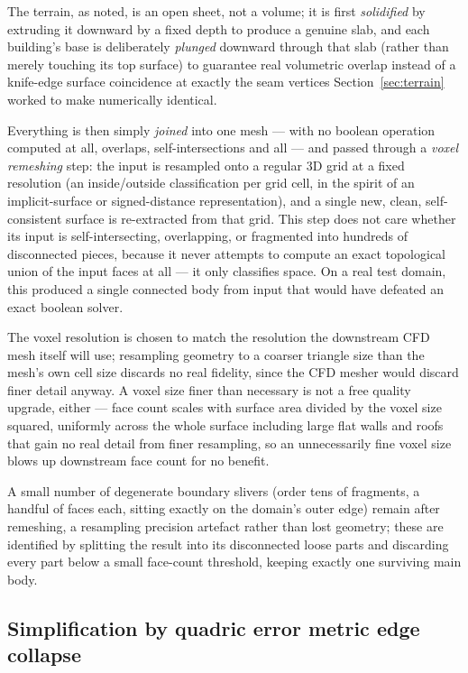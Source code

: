 \documentclass[11pt]{article}
\begin{document}
The terrain, as noted, is an open sheet, not a volume; it is first \emph{solidified} by
extruding it downward by a fixed depth to produce a genuine slab, and each building's base is
deliberately \emph{plunged} downward through that slab (rather than merely touching its top
surface) to guarantee real volumetric overlap instead of a knife-edge surface coincidence at
exactly the seam vertices Section~\ref{sec:terrain} worked to make numerically identical.

Everything is then simply \emph{joined} into one mesh --- with no boolean operation computed at
all, overlaps, self-intersections and all --- and passed through a \emph{voxel remeshing} step:
the input is resampled onto a regular 3D grid at a fixed resolution (an inside/outside
classification per grid cell, in the spirit of an implicit-surface or signed-distance
representation), and a single new, clean, self-consistent surface is re-extracted from that
grid. This step does not care whether its input is self-intersecting, overlapping, or
fragmented into hundreds of disconnected pieces, because it never attempts to compute an exact
topological union of the input faces at all --- it only classifies space. On a real test
domain, this produced a single connected body from input that would have defeated an exact
boolean solver.

The voxel resolution is chosen to match the resolution the downstream CFD mesh itself will
use; resampling geometry to a coarser triangle size than the mesh's own cell size discards no
real fidelity, since the CFD mesher would discard finer detail anyway. A voxel size finer than
necessary is not a free quality upgrade, either --- face count scales with surface area
divided by the voxel size squared, uniformly across the whole surface including large flat
walls and roofs that gain no real detail from finer resampling, so an unnecessarily fine voxel
size blows up downstream face count for no benefit.

A small number of degenerate boundary slivers (order tens of fragments, a handful of faces
each, sitting exactly on the domain's outer edge) remain after remeshing, a resampling
precision artefact rather than lost geometry; these are identified by splitting the result into
its disconnected loose parts and discarding every part below a small face-count threshold,
keeping exactly one surviving main body.

\subsection{Simplification by quadric error metric edge collapse}
\end{document}
